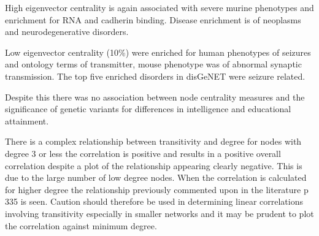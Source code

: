 High eigenvector centrality is again associated with severe murine phenotypes and enrichment for RNA and cadherin binding. Disease enrichment is of neoplasms and neurodegenerative disorders. 

Low eigenvector centrality (10\%) were enriched for human phenotypes of seizures and ontology terms of transmitter, mouse phenotype was of abnormal synaptic transmission. The top five enriched disorders in disGeNET were seizure related. 

Despite this there was no association between node centrality measures and the significance of genetic variants for differences in intelligence and educational attainment.

There is a complex relationship between transitivity and degree for nodes with degree 3 or less the correlation is positive and results in a positive overall correlation despite a plot of the relationship appearing clearly negative. This is due to the large number of low degree nodes. When the correlation is calculated for higher degree the relationship previously commented upon in the literature \cite{newman} p 335 is seen. Caution should therefore be used in determining linear correlations involving transitivity especially in smaller networks and it may be prudent to plot the correlation against minimum degree.


 



